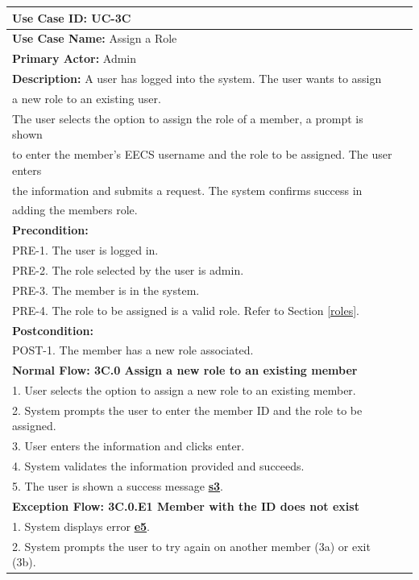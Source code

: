 \documentclass[fontsize=12pt,paper=letter,twoside]{scrartcl}
\begin{document}
\begin{table}[!htb]
\begin{center}
\begin{tabular}{|l|l|}
\hline
\textbf{Use Case ID:} UC-3C \\ \hline
\textbf{Use Case Name:} Assign a Role \\ \hline
\textbf {Primary Actor:} Admin \\ \hline
\textbf{Description:} A user has logged into the system. The user wants to assign \\a new role to an existing user. \\The user selects the option to assign the role of a member, a prompt is shown \\to enter the member's EECS username and the role to be assigned. The user enters \\the information and submits a request. The system confirms success in \\adding the members role.\\ \hline
\textbf{Precondition:}
\\ PRE-1. The user is logged in.
\\ PRE-2. The role selected by the user is admin.
\\ PRE-3. The member is in the system.
\\ PRE-4. The role to be assigned is a valid role. Refer to Section \ref{roles}. \\ \hline
\textbf{Postcondition:}
\\ POST-1. The member has a new role associated. \\ \hline
\textbf{Normal Flow: 3C.0 Assign a new role to an existing member}
\\ 1. User selects the option to assign a new role to an existing member.
\\ 2. System prompts the user to enter the member ID and the role to be assigned.
\\ 3. User enters the information and clicks enter.
\\ 4. System validates the information provided and succeeds.
\\ 5. The user is shown a success message \hyperref[app:success]{\textbf{s3}}.
\\ \hline
\textbf{Exception Flow: 3C.0.E1 Member with the ID does not exist}
\\ 1. System displays error \hyperref[app:error]{\textbf{e5}}.
\\ 2. System prompts the user to try again on another member (3a) or exit (3b).

\end{tabular}
\end{center}
\end{table}
\end{document}
